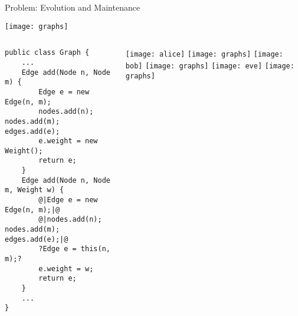 \begin{frame}[fragile]{Problem: Evolution and Maintenance}
	\vspace{-1.7cm}
	\begin{flushright}		
		\texttt{[image: graphs]}
	\end{flushright}
	\vspace{0.1cm}
	\begin{tiny}
		\begin{columns}
				\vspace{-12mm}
\vspace{3mm}					
\begin{lstlisting}
public class Graph {
	...
	Edge add(Node n, Node m) {
		Edge e = new Edge(n, m);
		nodes.add(n); nodes.add(m); edges.add(e);
		e.weight = new Weight();
		return e;
	}
	Edge add(Node n, Node m, Weight w) {
		@|Edge e = new Edge(n, m);|@
		@|nodes.add(n); nodes.add(m); edges.add(e);|@
		?Edge e = this(n, m);?	
		e.weight = w;
		return e;
	}
	...
}
\end{lstlisting}	
				\vspace{2mm}
				\texttt{[image: alice]}
				\texttt{[image: graphs]}
				\hspace{2.5mm}
				\texttt{[image: bob]}
				\texttt{[image: graphs]}
				\hspace{2.5mm}
				\texttt{[image: eve]}
				\texttt{[image: graphs]}
		\end{columns}
	\end{tiny}
\end{frame}

